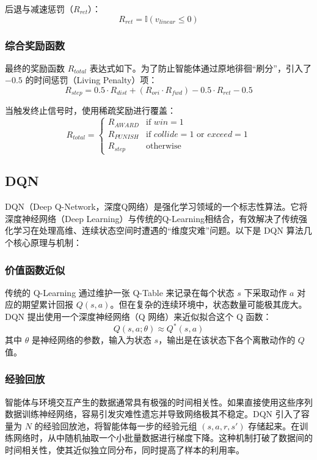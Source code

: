 \documentclass[
  oneside,
  degree=bachelor,
  fullwidthstop=false,
  fontset=fandol,
  times=false,
  minted=true,
  biblatex=true,
]{tongjithesis}
\begin{document}
后退与减速惩罚（$R_{ret}$）：
\begin{equation}
    R_{ret} = \mathbb{I}(v_{linear} \leq 0)
\end{equation}

\subsubsection{综合奖励函数}

最终的奖励函数 $R_{total}$ 表达式如下。为了防止智能体通过原地徘徊“刷分”，引入了 $-0.5$ 的时间惩罚（Living Penalty）项：
\begin{equation}
    R_{step} = 0.5 \cdot R_{dist} + (R_{ori} \cdot R_{fwd}) - 0.5 \cdot R_{ret} - 0.5
\end{equation}

当触发终止信号时，使用稀疏奖励进行覆盖：
\begin{equation}
    R_{total} =
    \begin{cases}
        R_{AWARD} & \text{if } win = 1 \\
        R_{PUNISH} & \text{if } collide = 1 \text{ or } exceed = 1 \\
        R_{step} & \text{otherwise}
    \end{cases}
\end{equation}

\subsection{DQN}
DQN（Deep Q-Network，深度Q网络）是强化学习领域的一个标志性算法。它将深度神经网络（Deep Learning）与传统的Q-Learning相结合，有效解决了传统强化学习在处理高维、连续状态空间时遭遇的“维度灾难”问题。以下是 DQN 算法几个核心原理与机制：

\subsubsection{价值函数近似}
传统的 Q-Learning 通过维护一张 Q-Table 来记录在每个状态 $s$ 下采取动作 $a$ 对应的期望累计回报 $Q(s, a)$。但在复杂的连续环境中，状态数量可能极其庞大。DQN 提出使用一个深度神经网络（Q 网络）来近似拟合这个 Q 函数：
\begin{equation}
    Q(s, a; \theta) \approx Q^*(s, a)
\end{equation}
其中 $\theta$ 是神经网络的参数，输入为状态 $s$，输出是在该状态下各个离散动作的 $Q$ 值。

\subsubsection{经验回放}
智能体与环境交互产生的数据通常具有极强的时间相关性。如果直接使用这些序列数据训练神经网络，容易引发灾难性遗忘并导致网络极其不稳定。DQN 引入了容量为 $N$ 的经验回放池，将智能体每一步的经验元组 $(s, a, r, s')$ 存储起来。在训练网络时，从中随机抽取一个小批量数据进行梯度下降。这种机制打破了数据间的时间相关性，使其近似独立同分布，同时提高了样本的利用率。
\end{document}
